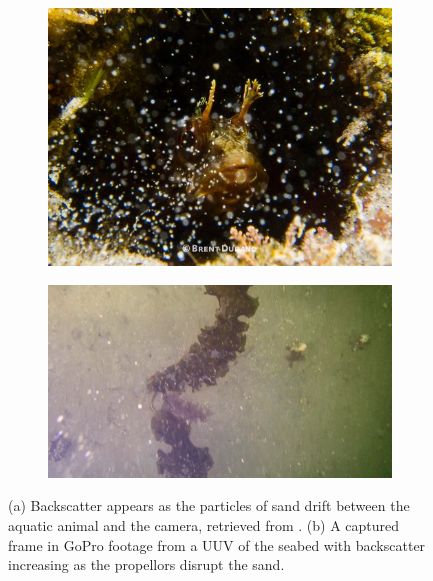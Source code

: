 \begin{figure}[H]
    \centering
    \begin{subfigure}{.49\textwidth}
        \centering
        \includegraphics[width=1\linewidth]{assets/backscatter_article_durand2.jpg}
        \caption{}
    \end{subfigure}
    \hfill
    \begin{subfigure}{.49\textwidth}
        \centering
        \includegraphics[width=1\linewidth]{assets/backscatter_test_vid.png}
        \caption{}
    \end{subfigure}
    \caption{(a) Backscatter appears as the particles of sand drift between the aquatic animal and the camera, retrieved from \cite{brentdurandEasyWaysEliminate2013}. (b) A captured frame in GoPro footage from a UUV of the seabed with backscatter increasing as the propellors disrupt the sand.}
    \label{fig:backscatter}
\end{figure}

